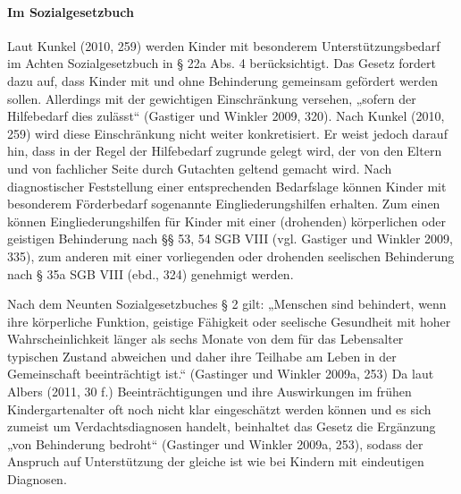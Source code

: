 \paragraph{Im Sozialgesetzbuch}
Laut Kunkel (2010, 259) werden Kinder mit besonderem Unterstützungsbedarf im Achten Sozialgesetzbuch in § 22a Abs. 4 berücksichtigt. Das Gesetz fordert dazu auf, dass Kinder mit und ohne Behinderung gemeinsam gefördert werden sollen. Allerdings mit der gewichtigen Einschränkung versehen, „sofern der Hilfebedarf dies zulässt“ (Gastiger und Winkler 2009, 320). Nach Kunkel (2010, 259) wird diese Einschränkung nicht weiter konkretisiert. Er weist jedoch darauf hin, dass in der Regel der Hilfebedarf zugrunde gelegt wird, der von den Eltern und von fachlicher Seite durch Gutachten geltend gemacht wird. Nach diagnostischer Feststellung einer entsprechenden Bedarfslage können Kinder mit besonderem Förderbedarf sogenannte Eingliederungshilfen erhalten. Zum einen können Eingliederungshilfen für Kinder mit einer (drohenden) körperlichen oder geistigen Behinderung nach §§ 53, 54 SGB VIII (vgl. Gastiger und Winkler 2009, 335), zum anderen mit einer vorliegenden oder drohenden seelischen Behinderung nach § 35a SGB VIII (ebd., 324) genehmigt werden.
 
Nach dem Neunten Sozialgesetzbuches § 2 gilt: „Menschen sind behindert, wenn ihre körperliche Funktion, geistige Fähigkeit oder seelische Gesundheit mit hoher Wahrscheinlichkeit länger als sechs Monate von dem für das Lebensalter typischen Zustand abweichen und daher ihre Teilhabe am Leben in der Gemeinschaft beeinträchtigt ist.“ (Gastinger und Winkler 2009a, 253) Da laut Albers (2011, 30 f.) Beeinträchtigungen und ihre Auswirkungen im frühen Kindergartenalter oft noch nicht klar eingeschätzt werden können und es sich zumeist um Verdachtsdiagnosen handelt, beinhaltet das Gesetz die Ergänzung „von Behinderung bedroht“ (Gastinger und Winkler 2009a, 253), sodass der Anspruch auf Unterstützung der gleiche ist wie bei Kindern mit eindeutigen Diagnosen.

